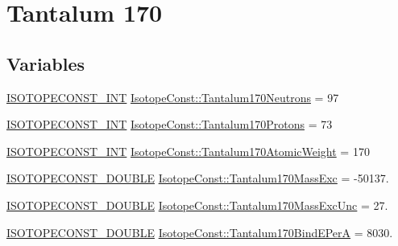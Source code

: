 \hypertarget{group___isotope_const-_tantalum-_ta170}{}\section{Tantalum 170}
\label{group___isotope_const-_tantalum-_ta170}
\subsection*{Variables}
\begin{DoxyCompactItemize}
\item 
\mbox{\hyperlink{group___isotope_const-_macros_ga5f18360b3e99483a35c32d789e62621c}{I\+S\+O\+T\+O\+P\+E\+C\+O\+N\+S\+T\+\_\+\+I\+NT}} \mbox{\hyperlink{group___isotope_const-_tantalum-_ta170_ga27f7bb55db7e94632e1e29fdf26e2996}{Isotope\+Const\+::\+Tantalum170\+Neutrons}} = 97
\item 
\mbox{\hyperlink{group___isotope_const-_macros_ga5f18360b3e99483a35c32d789e62621c}{I\+S\+O\+T\+O\+P\+E\+C\+O\+N\+S\+T\+\_\+\+I\+NT}} \mbox{\hyperlink{group___isotope_const-_tantalum-_ta170_ga87533daa7dfab8780ac3114246bff61c}{Isotope\+Const\+::\+Tantalum170\+Protons}} = 73
\item 
\mbox{\hyperlink{group___isotope_const-_macros_ga5f18360b3e99483a35c32d789e62621c}{I\+S\+O\+T\+O\+P\+E\+C\+O\+N\+S\+T\+\_\+\+I\+NT}} \mbox{\hyperlink{group___isotope_const-_tantalum-_ta170_ga120a4f2a2bd789f37589d0a5f54b95d3}{Isotope\+Const\+::\+Tantalum170\+Atomic\+Weight}} = 170
\item 
\mbox{\hyperlink{group___isotope_const-_macros_ga8f45a7272ce02c0b4c65c44636ed719a}{I\+S\+O\+T\+O\+P\+E\+C\+O\+N\+S\+T\+\_\+\+D\+O\+U\+B\+LE}} \mbox{\hyperlink{group___isotope_const-_tantalum-_ta170_ga07733a8d96ca66a8db80974fb714fa26}{Isotope\+Const\+::\+Tantalum170\+Mass\+Exc}} = -\/50137.
\item 
\mbox{\hyperlink{group___isotope_const-_macros_ga8f45a7272ce02c0b4c65c44636ed719a}{I\+S\+O\+T\+O\+P\+E\+C\+O\+N\+S\+T\+\_\+\+D\+O\+U\+B\+LE}} \mbox{\hyperlink{group___isotope_const-_tantalum-_ta170_ga9d662b004db44626fb22608b7b80a4c4}{Isotope\+Const\+::\+Tantalum170\+Mass\+Exc\+Unc}} = 27.
\item 
\mbox{\hyperlink{group___isotope_const-_macros_ga8f45a7272ce02c0b4c65c44636ed719a}{I\+S\+O\+T\+O\+P\+E\+C\+O\+N\+S\+T\+\_\+\+D\+O\+U\+B\+LE}} \mbox{\hyperlink{group___isotope_const-_tantalum-_ta170_ga69b7a22d815ff782311205377cd27190}{Isotope\+Const\+::\+Tantalum170\+Bind\+E\+PerA}} = 8030.
\item 

\end{DoxyCompactItemize}
